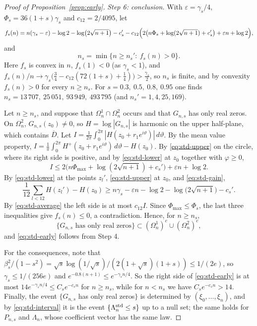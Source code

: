 \documentclass[11pt]{amsart}
\theoremstyle{definition}
\theoremstyle{remark}
\numberwithin{equation}{section}
\newcommand{\eps}{\varepsilon}
\begin{document}
\begin{proof}[Proof of Proposition~\ref{prop:early}]
\emph{Step 6: conclusion.} With $\eps=\gamma_s/4$, $\Phi_s=36(1+s)\gamma_s$ and $c_{12}=2/4095$, let
\[
f_s(n)=n(\gamma_s-\eps)-\log2-\log\bigl(2\sqrt{n+1}\bigr)-c_s'-c_{12}\Bigl(2\bigl(n\Phi_s+\log(2\sqrt{n+1})+c_s'\bigr)+\eps n+\log2\Bigr),
\]
and
\begin{equation}\label{eq:std-onset}
n_s=\min\{n\ge n_s':\ f_s(n)>0\}.
\end{equation}
Here $f_s$ is convex in $n$, $f_s(1)<0$ (as $\gamma_s<1$), and $f_s(n)/n\to\gamma_s\bigl(\frac34-c_{12}(72(1+s)+\frac14)\bigr)>\frac{\gamma_s}2$, so $n_s$ is finite, and by convexity $f_s(n)>0$ for every $n\ge n_s$. For $s=0.3,\ 0.5,\ 0.8,\ 0.95$ one finds $n_s=13\,707,\ 25\,051,\ 93\,949,\ 493\,795$ (and $n_s'=1,4,25,169$).

Let $n\ge n_s$, and suppose that $\Omega_n^1\cap\Omega_n^2$ occurs and that $G_{n,s}$ has only real zeros. On $\Omega_n^2$, $G_{n,s}(z_0)\ne0$, so $H=\log|G_{n,s}|$ is harmonic on the upper half-plane, which contains $\overline D$. Let $I=\frac1{2\pi}\int_0^{2\pi}|H(z_0+r_1e^{i\vartheta})|\,d\vartheta$. By the mean value property, $I=\frac1\pi\int_0^{2\pi}H^+(z_0+r_1e^{i\vartheta})\,d\vartheta-H(z_0)$. By \eqref{eq:std-upper} on the circle, where its right side is positive, and by \eqref{eq:std-lower} at $z_0$ together with $\varphi\ge0$,
\[
I\le2\bigl(n\Phi_{\max}+\log(2\sqrt{n+1})+c_s'\bigr)+\eps n+\log2 .
\]
By \eqref{eq:std-lower} at the points $z_l'$, \eqref{eq:std-upper} at $z_0$, and \eqref{eq:std-gain},
\[
\frac1{12}\sum_{l<12}H(z_l')-H(z_0)\ge n\gamma_s-\eps n-\log2-\log\bigl(2\sqrt{n+1}\bigr)-c_s' .
\]
By \eqref{eq:std-average} the left side is at most $c_{12}I$. Since $\Phi_{\max}\le\Phi_s$, the last three inequalities give $f_s(n)\le0$, a contradiction. Hence, for $n\ge n_s$,
\[
\{G_{n,s}\text{ has only real zeros}\}\subset(\Omega_n^1)^c\cup(\Omega_n^2)^c ,
\]
and \eqref{eq:std-early} follows from Step 4.

For the consequences, note that $\beta_s^2/(1-s^2)=\sqrt s\log(1/\sqrt s)/(2(1+\sqrt s)(1+s))\le1/(2e)$, so $\gamma_s\le1/(256e)$ and $e^{-0.8(n+1)}\le e^{-\gamma_sn/4}$. So the right side of \eqref{eq:std-early} is at most $14e^{-\gamma_sn/4}\le C_se^{-c_sn}$ for $n\ge n_s$, while for $n<n_s$ we have $C_se^{-c_sn}>14$. Finally, the event $\{G_{n,s}$ has only real zeros$\}$ is determined by $(\xi_0,\dots,\xi_n)$, and by \eqref{eq:std-interval} it is the event $\{\Lambda_n^{\rm std}\le s\}$ up to a null set; the same holds for $P_{n,s}$ and $\Lambda_n$, whose coefficient vector has the same law.
\end{proof}
\end{document}
